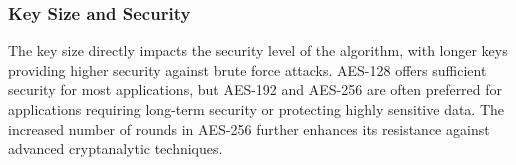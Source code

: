 \subsubsection*{Key Size and Security}

The key size directly impacts the security level of the algorithm, with 
longer keys providing higher security against brute force attacks. AES-128 offers sufficient security 
for most applications, but AES-192 and AES-256 are often preferred for applications requiring 
long-term security or protecting highly sensitive data. The increased number of rounds in AES-256 
further enhances its resistance against advanced cryptanalytic techniques.
